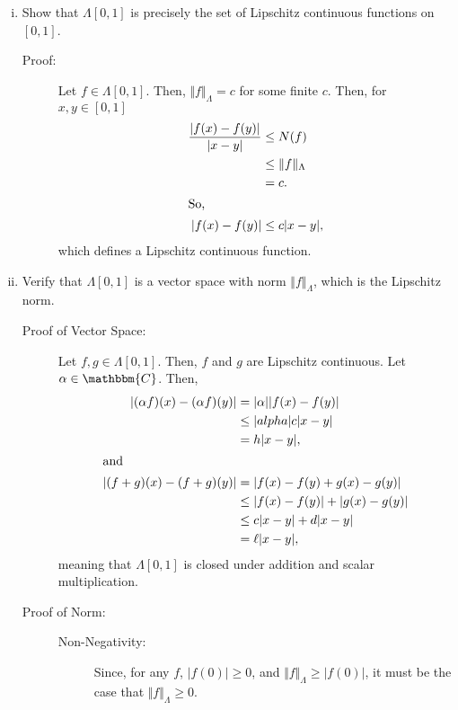 \documentclass[8pt]{extarticle}
\begin{document}
  \begin{enumerate}[(i)]
    \item Show that $\Lambda[0,1]$ is precisely the set of Lipschitz continuous functions on $[0,1]$.
      \begin{description}
        \item[Proof:] Let $f\in \Lambda[0,1]$. Then, $\Vert f\Vert_{\Lambda} = c$ for some finite $c$. Then, for $x,y\in [0,1]$
          \begin{align*}
            \frac{|f(x)-f(y)|}{|x-y|}&\leq N(f)\\
                                     &\leq \Vert f\Vert_{\Lambda}\\
                                     &= c.\\
                                     \shortintertext{So,}
            |f(x)-f(y)| &\leq c|x-y|,
          \end{align*}
          which defines a Lipschitz continuous function.
      \end{description}
    \item Verify that $\Lambda[0,1]$ is a vector space with norm $\Vert f\Vert_{\Lambda}$, which is the Lipschitz norm.
      \begin{description}
        \item[Proof of Vector Space:] Let $f,g\in \Lambda[0,1]$. Then, $f$ and $g$ are Lipschitz continuous. Let $\alpha\in \mathbbm{C}$. Then,
          \begin{align*}
            |(\alpha f)(x) - (\alpha f)(y)| &= |\alpha||f(x)-f(y)|\\
                                            &\leq |alpha|c|x-y|\\
                                            &= h|x-y|,\\
                                            \shortintertext{and}
            |(f+g)(x) - (f+g)(y)| &= |f(x)-f(y) + g(x)-g(y)|\\
                                  &\leq |f(x)-f(y)| + |g(x)-g(y)|\\
                                  &\leq c|x-y| + d|x-y|\\
                                  &= \ell|x-y|,
          \end{align*}
          meaning that $\Lambda[0,1]$ is closed under addition and scalar multiplication.
        \item[Proof of Norm:]\hfill
          \begin{description}
            \item[Non-Negativity:] Since, for any $f$, $|f(0)| \geq 0$, and $\Vert f\Vert_{\Lambda} \geq |f(0)|$, it must be the case that $\Vert f \Vert_{\Lambda} \geq 0$.

\end{description}
\end{description}
\end{enumerate}
\end{document}
